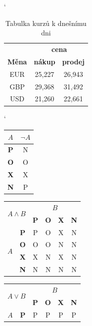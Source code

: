 \documentclass[11pt, a4paper]{article}
\begin{document}
\begin{table}[ht] \catcode`
\begin{center}
\begin{tabular}{|c|c|c|}
\hline & \multicolumn{2}{|c|}{\textbf{cena}} \\
\cline{2-3} \textbf{Měna} & \textbf{nákup} & \textbf{prodej} \\ \hline
EUR & 25,227 & 26,943 \\
GBP & 29,368 & 31,492 \\
USD & 21,260 & 22,661 \\ 
\hline
\end{tabular}
\caption{Tabulka kurzů k dnešnímu dni}
\label{firstTable}
\end{center}
\end{table}

\begin{table}[ht] \catcode`
\begin{center}
\begin{tabular}{|c|c|}
\hline
$A$ & $\neg A$ \\
\hline
\textbf{P} & N \\
\hline
\textbf{O} & O \\
\hline
\textbf{X} & X \\
\hline
\textbf{N} & P \\
\hline
\end{tabular}
\begin{tabular}{|c|c|c|c|c|c|}
\hline
\multicolumn{2}{|c|}{\multirow{2}{*}{$A \wedge B$}} & \multicolumn{4}{|c|}{$B$} \\ 
\cline{3-6}
\multicolumn{2}{|c|}{} & {\textbf{P}} & {\textbf{O}} & {\textbf{X}} & {\textbf{N}} \\ 
\hline
\multirow{4}{*}{$A$} 
& {\textbf{P}} & P & O & X & N \\
\cline{2-6}
& {\textbf{O}} & O & O & N & N \\ 
\cline{2-6}
& {\textbf{X}} & X & N & X & N \\ 
\cline{2-6}
& {\textbf{N}} & N & N & N & N \\ 
\hline
\end{tabular}
\begin{tabular}{|c|c|c|c|c|c|}
\hline
\multicolumn{2}{|c|}{\multirow{2}{*}{$A \lor B$}} & \multicolumn{4}{|c|}{$B$} \\ 
\cline{3-6}
\multicolumn{2}{|c|}{} & {\textbf{P}} & {\textbf{O}} & {\textbf{X}} & {\textbf{N}} \\ 
\hline
\multirow{4}{*}{$A$} 
& {\textbf{P}} & P & P & P & P \\

\end{tabular}
\end{center}
\end{table}
\end{document}
